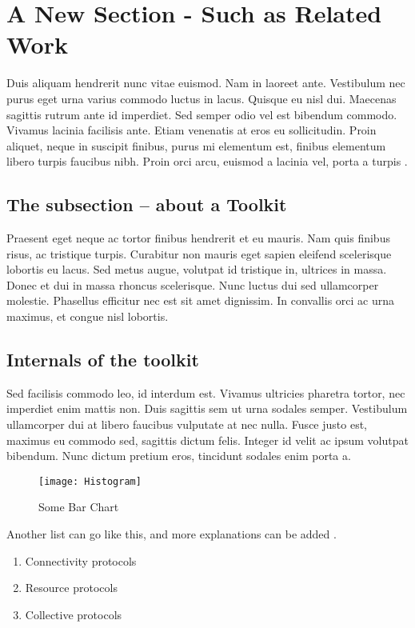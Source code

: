 \chapter{A New Section - Such as Related Work}
\label{cahp-rl}

Duis aliquam hendrerit nunc vitae euismod. Nam in laoreet ante. Vestibulum nec purus eget urna varius commodo luctus in lacus. Quisque eu nisl dui. Maecenas sagittis rutrum ante id imperdiet. Sed semper odio vel est bibendum commodo. Vivamus lacinia facilisis ante. Etiam venenatis at eros eu sollicitudin. Proin aliquet, neque in suscipit finibus, purus mi elementum est, finibus elementum libero turpis faucibus nibh. Proin orci arcu, euismod a lacinia vel, porta a turpis \cite{apples1}.

\section{The subsection -- about a Toolkit}

Praesent eget neque ac tortor finibus hendrerit et eu mauris. Nam quis finibus risus, ac tristique turpis. Curabitur non mauris eget sapien eleifend scelerisque lobortis eu lacus. Sed metus augue, volutpat id tristique in, ultrices in massa. Donec et dui in massa rhoncus scelerisque. Nunc luctus dui sed ullamcorper molestie. Phasellus efficitur nec est sit amet dignissim. In convallis orci ac urna maximus, et congue nisl lobortis.

\section{Internals of the toolkit}

Sed facilisis commodo leo, id interdum est. Vivamus ultricies pharetra tortor, nec imperdiet enim mattis non. Duis sagittis sem ut urna sodales semper. Vestibulum ullamcorper dui at libero faucibus vulputate at nec nulla. Fusce justo est, maximus eu commodo sed, sagittis dictum felis. Integer id velit ac ipsum volutpat bibendum. Nunc dictum pretium eros, tincidunt sodales enim porta a.

\begin{figure}[ht]
  \begin{center}
    \texttt{[image: Histogram]}
    \caption{Some Bar Chart}
  \end{center}
\end{figure}

Another list can go like this, and more explanations can be added \cite{apples2}.
\begin{enumerate}
  \item
  Connectivity protocols 
  \item
  Resource protocols 
  \item
  Collective protocols 
\end{enumerate}


